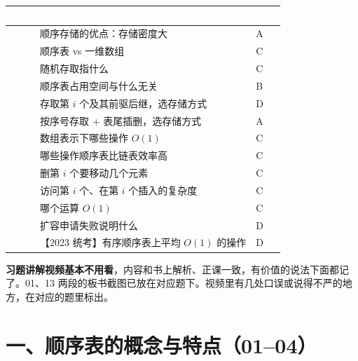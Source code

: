 \documentclass[10.5pt,a4paper,oneside]{article}
\newcommand{\tocback}{\par\vspace{-3pt}{\hfill\footnotesize\hyperlink{toc}{\textcolor{wdgray}{\ensuremath{\uparrow}\,回到目录}}}\par\vspace{-4pt}}
\begin{document}
{
\begin{xltabular}{\linewidth}{>{\hsize\raggedright\arraybackslash}X>{\hsize\raggedright\arraybackslash}X>{\hsize\raggedright\arraybackslash}X}
\textcolor{white}{\bfseries 题号} & \textcolor{white}{\bfseries 考点} & \textcolor{white}{\bfseries 答案} \\
 & 顺序存储的优点：存储密度大 & A \\  & 顺序表 vs 一维数组 & C \\  & 随机存取指什么 & C \\  & 顺序表占用空间与什么无关 & B \\  & 存取第 \(i\) 个及其前驱后继，选存储方式 & D \\  & 按序号存取 + 表尾插删，选存储方式 & A \\  & 数组表示下哪些操作 \(O(1)\) & C \\  & 哪些操作顺序表比链表效率高 & C \\  & 删第 \(i\) 个要移动几个元素 & C \\  & 访问第 \(i\) 个、在第 \(i\) 个插入的复杂度 & C \\  & 哪个运算 \(O(1)\) & C \\  & 扩容申请失败说明什么 & D \\  & 【2023 统考】有序顺序表上平均 \(O(1)\) 的操作 & D \\ \hline
\end{xltabular}\par\vspace{4pt}}

\begin{fixbox}

\textbf{习题讲解视频基本不用看}，内容和书上解析、正课一致，有价值的说法下面都记了。01、13
两段的板书截图已放在对应题下。视频里有几处口误或说得不严的地方，在对应的题里标出。

\end{fixbox}

\hypertarget{ux4e00ux987aux5e8fux8868ux7684ux6982ux5ff5ux4e0eux7279ux70b90104}{%
\section{一、顺序表的概念与特点（01--04）}\label{ux4e00ux987aux5e8fux8868ux7684ux6982ux5ff5ux4e0eux7279ux70b90104}}

\tocback
\end{document}
